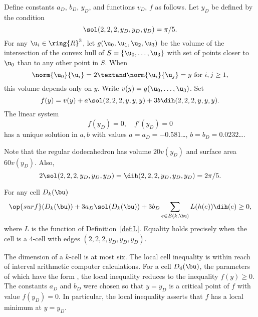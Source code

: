 \begin{definition}[$a_D$,~$b_D$,~$y_D$,~$v_D$,~$f$]
  Define constants $a_D$, $b_D$, $y_D$, and functions $v_D$, $f$ as
  follows.  Let $y_D$ be defined by the condition
\[
\sol(2,2,2,y_D,y_D,y_D) = \pi/5.
\]
For any $\u_i\in\ring{R}^3$, let $g(\u_0,\u_1,\u_2,\u_3)$ be the
volume of the intersection of the convex hull of
$S=\{\u_0,\ldots,\u_3\}$ with set of points closer to $ \u_0$ than to
any other point in $S$.  When
\begin{equation}\label{eqn:uy}
  \norm{\u_0}{\u_i}=2\textand \norm{ \u_i}{ \u_j} = y\text{ for }i,j\ge 1,
\end{equation} 
this volume depends only on $y$. Write $v(y) = g(\u_0,\ldots,\u_3)$.
Set
\[
  f(y) = v(y) + a \sol(2,2,2,y,y,y) + 3 b \dih(2,2,2,y,y,y).
\]
The linear system
\begin{equation}\label{eqn:fyD}
f(y_D) = 0,\quad f'(y_D) = 0
\end{equation}
has a unique solution in $a,b$ with values $a=a_D=-0.581$\dots,
$b=b_D=0.0232$\dots.
\end{definition}
%
%
%
%
%
%

Note that the regular dodecahedron has volume $20 v(y_D)$ and surface
area $60 v(y_D)$.  Also,
\begin{equation}
  2\sol(2,2,2,y_D,y_D,y_D) =\dih(2,2,2,y_D,y_D,y_D)=2\pi/5.
\end{equation}
%
%

\begin{lemma}\label{lemma:D-local}
For any cell $D_k(\bu)$
\[
  \op{surf}(D_k(\bu)) + 3 a_D \sol(D_k(\bu)) 
+ 3 b_D \sum_{e\in E(k,\bu)} L(h(e)) \dih(e) \ge 0,
\]
where $L$ is the function of Definition~\ref{def:L}.  Equality holds
precisely when the cell is a $4$-cell with edges
$(2,2,2,y_D,y_D,y_D)$.
\end{lemma}
%

\begin{remark}
  The dimension of a $k$-cell is at most six.  The local cell
  inequality is within reach of interval arithmetic computer
  calculations.  For a cell $D_4(\bu)$, the parameters of which have the form
  , the local inequality reduces to the inequality
  $f(y)\ge 0$.  The constants $a_D$ and $b_D$ were chosen so that
  $y=y_D$ is a critical point of $f$ with value $f(y_D)=0$.  In
  particular, the local inequality asserts that $f$ has a local
  minimum at $y=y_D$.
\end{remark}

